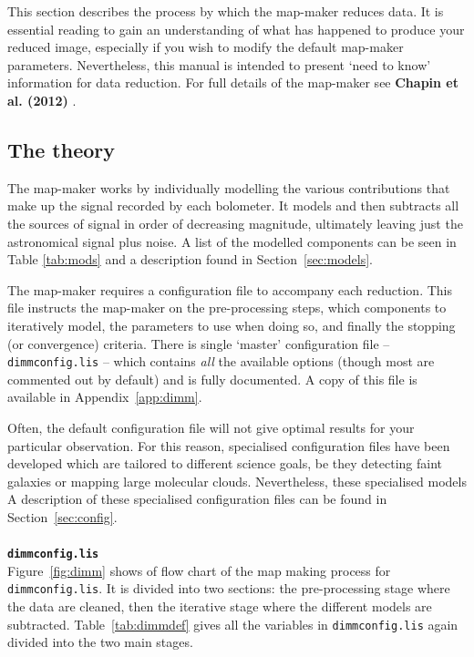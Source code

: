 \documentclass[twoside,11pt]{article}
\newcommand{\xlabel}[1]{}
\renewcommand{\_}{\texttt{\symbol{95}}}
\begin{document}
This section describes the process by which the map-maker reduces
data. It is essential reading to gain an understanding of what has
happened to produce your reduced image, especially if you wish to
modify the default map-maker parameters. Nevertheless, this manual
is intended to present `need to know' information for data reduction.
For full details of the map-maker see \textbf{Chapin et al. (2012)} \cite{mapmaker}.

\subsection{\xlabel{dimm_theory}The theory}

The map-maker works by individually modelling the various
contributions that make up the signal recorded by each bolometer. It
models and then subtracts all the sources of signal in order of
decreasing magnitude, ultimately leaving just the astronomical signal
plus noise. A list of the modelled components can be seen in Table
\ref{tab:mods} and a description found in Section~\ref{sec:models}.

The map-maker requires a configuration file to accompany each
reduction. This file instructs the map-maker on the pre-processing
steps, which components to iteratively model, the parameters to use
when doing so, and finally the stopping (or convergence) criteria.
There is single `master' configuration file -- \texttt{dimmconfig.lis}
-- which contains \emph{all} the available options (though most are
commented out by default) and is fully documented. A copy of this file
is available in Appendix~\ref{app:dimm}.

Often, the default configuration file will not give optimal results
for your particular observation. For this reason, specialised
configuration files have been developed which are tailored to
different science goals, be they detecting faint galaxies or mapping
large molecular clouds. Nevertheless, these specialised models A
description of these specialised configuration files can be found in
Section~\ref{sec:config}.
\\ \\
{\large{\texttt{\bf dimmconfig.lis}}}\\
Figure~\ref{fig:dimm} shows of flow chart of the map making process
for \texttt{dimmconfig.lis}. It is divided into two sections: the
pre-processing stage where the data are cleaned, then the iterative
stage where the different models are subtracted.
Table~\ref{tab:dimmdef} gives all the variables in
\texttt{dimmconfig.lis} again divided into the two main stages.
\end{document}
